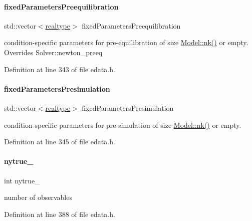 \paragraph{\texorpdfstring{fixedParametersPreequilibration}{fixedParametersPreequilibration}}
{\footnotesize\ttfamily std\+::vector$<$\mbox{\hyperlink{namespaceamici_a1bdce28051d6a53868f7ccbf5f2c14a3}{realtype}}$>$ fixed\+Parameters\+Preequilibration}

condition-\/specific parameters for pre-\/equilibration of size \mbox{\hyperlink{classamici_1_1_model_a3d4130da64883565a06a86e7d6029da1}{Model\+::nk()}} or empty. Overrides Solver\+::newton\+\_\+preeq 

Definition at line 343 of file edata.\+h.

\mbox{\label{classamici_1_1_exp_data_a86fb66aedc21085f868fb6509a45c92d}} 
\paragraph{\texorpdfstring{fixedParametersPresimulation}{fixedParametersPresimulation}}
{\footnotesize\ttfamily std\+::vector$<$\mbox{\hyperlink{namespaceamici_a1bdce28051d6a53868f7ccbf5f2c14a3}{realtype}}$>$ fixed\+Parameters\+Presimulation}

condition-\/specific parameters for pre-\/simulation of size \mbox{\hyperlink{classamici_1_1_model_a3d4130da64883565a06a86e7d6029da1}{Model\+::nk()}} or empty. 

Definition at line 345 of file edata.\+h.

\mbox{\label{classamici_1_1_exp_data_ad7e81d1df451bdfcc55008fa06f2f389}} 
\paragraph{\texorpdfstring{nytrue\_}{nytrue\_}}
{\footnotesize\ttfamily int nytrue\+\_\+\hspace{0.3cm}{\ttfamily [protected]}}

number of observables 

Definition at line 388 of file edata.\+h.

\mbox{\label{classamici_1_1_exp_data_a8913df548ec3837f9179a5ab63b32d13}} 
